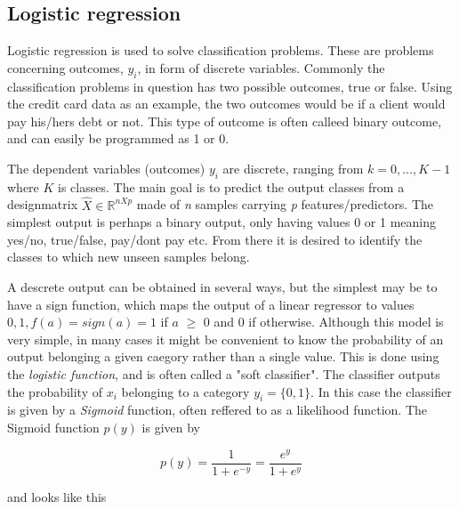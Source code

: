 \documentclass[a4paper,11pt,twocolumn]{article}
\begin{document}
\subsection{Logistic regression}

Logistic regression is used to solve classification problems. These are problems concerning outcomes, $y_i$, in form of discrete variables. Commonly the classification problems in question has two possible outcomes, true or false. Using the credit card data as an example, the two outcomes would be if a client would pay his/hers debt or not. This type of outcome is often calleed binary outcome, and can easily be programmed as 1 or 0.

The dependent variables (outcomes) $y_i$ are discrete, ranging from $k=0,...,K-1$ where $K$ is classes. The main goal is to predict the output classes from a designmatrix $\hat{X} \in \mathbb{R}^{nXp}$ made of \textit{n} samples carrying \textit{p} features/predictors. The simplest output is perhaps a binary output, only having values 0 or 1 meaning yes/no, true/false, pay/dont pay etc. From there it is desired to identify the classes to which new unseen samples belong. 

A descrete output can be obtained in several ways, but the simplest may be to have a sign function, which maps the output of a linear regressor to values ${0,1}, f(a)=sign(a) = 1$ if $a$ $\geq$ 0 and 0 if otherwise.  Although this model is very simple, in many cases it might be convenient to know the probability of an output belonging a given caegory rather than a single value. This is done using the \textit{logistic function}, and is often called a "soft classifier".  The classifier outputs the probability of $x_i$ belonging to a category $y_i=\{0,1\}$. In this case the classifier is given by a \textit{Sigmoid} function, often reffered to as a likelihood function. The Sigmoid function $p(y)$ is given by\cite{slides}

\begin{equation}
p(y) = \frac{1}{1+e^{-y}}  = \frac{e^y}{1+e^y}
\label{p1}
\end{equation}

and looks like this 
\end{document}
